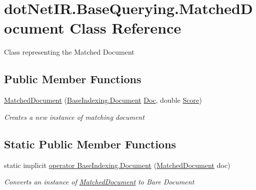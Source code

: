 \hypertarget{classdot_net_i_r_1_1_base_querying_1_1_matched_document}{}\section{dot\+Net\+I\+R.\+Base\+Querying.\+Matched\+Document Class Reference}
\label{classdot_net_i_r_1_1_base_querying_1_1_matched_document}


Class representing the Matched Document  


\subsection*{Public Member Functions}
\begin{DoxyCompactItemize}
\item 
\hyperlink{classdot_net_i_r_1_1_base_querying_1_1_matched_document_a9b5fc304a8fe2200734cea056a7526f6}{Matched\+Document} (\hyperlink{classdot_net_i_r_1_1_base_indexing_1_1_document}{Base\+Indexing.\+Document} \hyperlink{classdot_net_i_r_1_1_base_querying_1_1_matched_document_a7b3f2144f29567c77d2da128e8410c64}{Doc}, double \hyperlink{classdot_net_i_r_1_1_base_querying_1_1_matched_document_ab0c583848eaf13cb7a5d7c7ceb690e80}{Score})
\begin{DoxyCompactList}\small\item\em Creates a new instance of matching document \end{DoxyCompactList}\end{DoxyCompactItemize}
\subsection*{Static Public Member Functions}
\begin{DoxyCompactItemize}
\item 
static implicit \hyperlink{classdot_net_i_r_1_1_base_querying_1_1_matched_document_aa6324216561bb783acbd65e1ca888a07}{operator Base\+Indexing.\+Document} (\hyperlink{classdot_net_i_r_1_1_base_querying_1_1_matched_document}{Matched\+Document} doc)
\begin{DoxyCompactList}\small\item\em Converts an instance of \hyperlink{classdot_net_i_r_1_1_base_querying_1_1_matched_document}{Matched\+Document} to Bare Document \end{DoxyCompactList}\end{DoxyCompactItemize}
